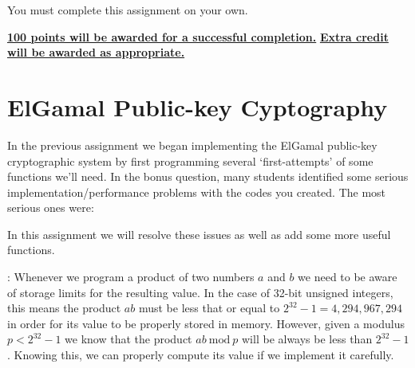 \documentclass{article}
\newcommand{\pad}{\vspace{8pt}\noindent}
\newcommand{\Mod}[1]{\ \mathrm{mod}\ #1}
\begin{document}
\pad You must complete this assignment on your own.

\vspace{16pt}
\begin{center}
\underline{\bf 100 points will be awarded for a successful completion.}
\vspace{8pt}\underline{\bf Extra credit will be awarded as appropriate.}
\end{center}

\newpage

\section*{ElGamal Public-key Cyptography}

In the previous assignment we began implementing the ElGamal public-key cryptographic system by first programming several `first-attempts' of some functions we'll need. In the bonus question, many students identified some serious implementation/performance problems with the codes you created. The most serious ones were:
In this assignment we will resolve these issues as well as add some more useful functions. 

\pad {\bf Safe products of integers modulo $p$}: 
Whenever we program a product of two numbers $a$ and $b$ we need to be aware of storage limits for the resulting value. In the case of 32-bit unsigned integers, this means the product $ab$ must be less that or equal to $2^{32}-1 = 4,294,967,294$ in order for its value to be properly stored in memory. However, given a modulus  $p<2^{32}-1$ we know that the product $ab \Mod{p}$ will be always be less than $2^{32}-1$. Knowing this, we can properly compute its value if we implement it carefully. 
\end{document}
